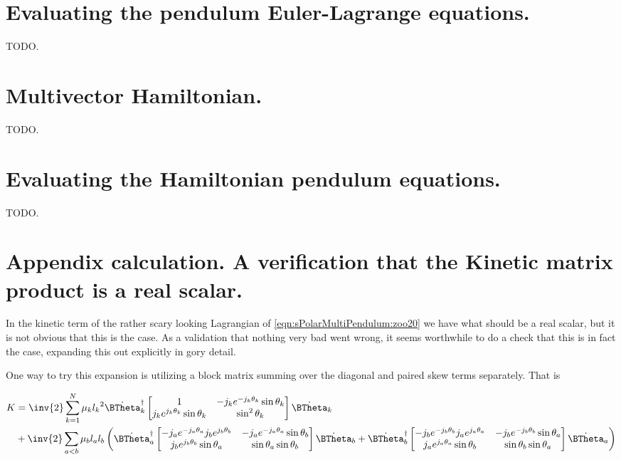 \section{Evaluating the pendulum Euler-Lagrange equations.}

TODO.

\section{Multivector Hamiltonian.}

TODO.

\section{Evaluating the Hamiltonian pendulum equations.}

TODO.

\section{Appendix calculation.  A verification that the Kinetic matrix product is a real scalar.}

In the kinetic term of the rather scary looking Lagrangian of \ref{eqn:sPolarMultiPendulum:zoo20} we have what should be a real scalar, but it is not obvious that this is the case.  As a validation that nothing very bad went wrong, it seems worthwhile to do a check that this is in fact the case, expanding this out explicitly in gory detail.

One way to try this expansion is utilizing a block matrix summing over the diagonal and paired skew terms separately.  That is

\begin{align*}
K &=
\inv{2}
\sum_{k=1}^N
\mu_k
{l_k}^2
{\dot{\BTheta}_k}^\dagger
\begin{bmatrix}
1 & - j_k e^{-j_k \theta_k} \sin\theta_k \\
j_k e^{j_k \theta_k} \sin\theta_k & \sin^2\theta_k 
\end{bmatrix}
\dot{\BTheta}_k \\
&+
\inv{2}
\sum_{a<b}
\mu_b
l_a l_b
\left(
{\dot{\BTheta}_a}^\dagger
\begin{bmatrix}
- j_a e^{-j_a \theta_a} j_b e^{j_b\theta_b} & - j_a e^{-j_a \theta_a} \sin\theta_b \\
j_b e^{j_b \theta_b} \sin\theta_a & \sin\theta_a \sin\theta_b
\end{bmatrix}
\dot{\BTheta}_b 
+
{\dot{\BTheta}_b}^\dagger
\begin{bmatrix}
- j_b e^{-j_b \theta_b} j_a e^{j_a\theta_a} & - j_b e^{-j_b \theta_b} \sin\theta_a \\
j_a e^{j_a \theta_a} \sin\theta_b & \sin\theta_b \sin\theta_a
\end{bmatrix}
\dot{\BTheta}_a
\right)
\end{align*}

